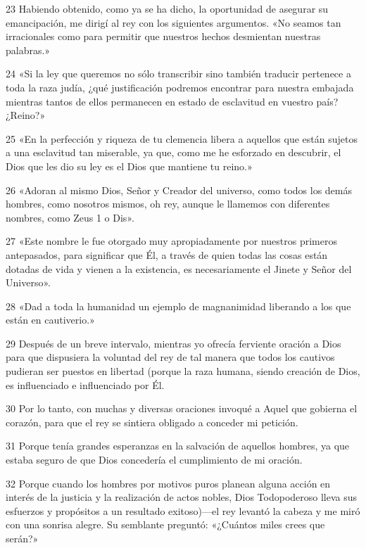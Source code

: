 \par 23 Habiendo obtenido, como ya se ha dicho, la oportunidad de asegurar su emancipación, me dirigí al rey con los siguientes argumentos. «No seamos tan irracionales como para permitir que nuestros hechos desmientan nuestras palabras.»

\par 24 «Si la ley que queremos no sólo transcribir sino también traducir pertenece a toda la raza judía, ¿qué justificación podremos encontrar para nuestra embajada mientras tantos de ellos permanecen en estado de esclavitud en vuestro país? ¿Reino?»

\par 25 «En la perfección y riqueza de tu clemencia libera a aquellos que están sujetos a una esclavitud tan miserable, ya que, como me he esforzado en descubrir, el Dios que les dio su ley es el Dios que mantiene tu reino.»

\par 26 «Adoran al mismo Dios, Señor y Creador del universo, como todos los demás hombres, como nosotros mismos, oh rey, aunque le llamemos con diferentes nombres, como Zeus 1 o Dis».

\par 27 «Este nombre le fue otorgado muy apropiadamente por nuestros primeros antepasados, para significar que Él, a través de quien todas las cosas están dotadas de vida y vienen a la existencia, es necesariamente el Jinete y Señor del Universo».

\par 28 «Dad a toda la humanidad un ejemplo de magnanimidad liberando a los que están en cautiverio.»

\par 29 Después de un breve intervalo, mientras yo ofrecía ferviente oración a Dios para que dispusiera la voluntad del rey de tal manera que todos los cautivos pudieran ser puestos en libertad (porque la raza humana, siendo creación de Dios, es influenciado e influenciado por Él.

\par 30 Por lo tanto, con muchas y diversas oraciones invoqué a Aquel que gobierna el corazón, para que el rey se sintiera obligado a conceder mi petición.

\par 31 Porque tenía grandes esperanzas en la salvación de aquellos hombres, ya que estaba seguro de que Dios concedería el cumplimiento de mi oración.

\par 32 Porque cuando los hombres por motivos puros planean alguna acción en interés de la justicia y la realización de actos nobles, Dios Todopoderoso lleva sus esfuerzos y propósitos a un resultado exitoso)—el rey levantó la cabeza y me miró con una sonrisa alegre. Su semblante preguntó: «¿Cuántos miles crees que serán?»

